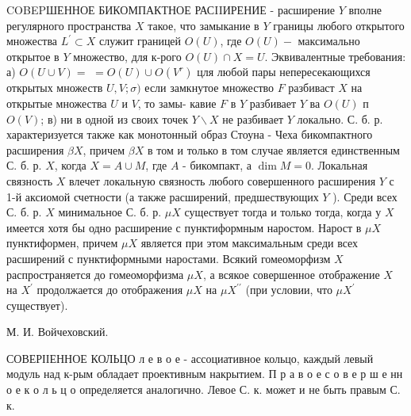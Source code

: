\documentclass[10pt]{article}
\begin{document}
COBEPШЕННОЕ БИКОМПАКТНОЕ РАСIIИРЕНИЕ - расширение $Y$ вполне регулярного пространства $X$ такое, что замыкание в $Y$ границы любого открытого множества $L^{\prime} \subset X$ служит границей $O(U)$, где $O(U)-$ максимально открытое в $Y$ множество, для к-рого $O(U) \cap X=U$. Эквивалентные требования: а) $O(U \cup V)=$ $=O(U) \cup O\left(V^{r}\right)$ цля любой пары непересекающихся открытых множеств $U, V ; \sigma)$ если замкнутое множество $F$ разбиваст $X$ на открытые множества $U$ и $V$, то замы- кавие $F$ в $Y$ разбивает $Y$ ва $O(U)$ п $O(V)$; в) ни в одной из своих точек $Y \backslash X$ не разбивает $Y$ локально. С. б. р. характеризуется также как монотонный образ Стоуна - Чеха бикомпактного расширения $\beta X$, причем $\beta X$ в том и только в том случае является единственным С. б. р. $X$, когда $X=A \cup M$, где $A$ - бикомпакт, а $\operatorname{dim} M=0$. Локальная связность $X$ влечет локальную связность любого совершенного расширения $Y$ с 1-й аксиомой счетности (а также расширений, предшествующих $Y$ ). Среди всех С. б. р. $X$ минимальное С. б. р. $\mu X$ существует тогда и только тогда, когда у $X$ имеется хотя бы одно расширение с пунктиформным наростом. Нарост в $\mu X$ пунктиформен, причем $\mu X$ является при этом максимальным среди всех расширений с пунктиформными наростами. Всякий гомеоморфизм $X$ распространяется до гомеоморфизма $\mu X$, а всякое совершенное отображение $X$ на $X^{\prime}$ продолжается до отображения $\mu X$ на $\mu X^{\prime \prime}$ (при условии, что $\mu X^{\prime}$ существует).



М. И. Войчеховский.



СОВЕРІІЕННОЕ КОЛЬЦО л е в о е - ассоциативное кольцо, каждый левый модуль над к-рым обладает проективным накрытием. П р а в о е с о в е р ш е нн о е к о л ь ц о определяется аналогично. Левое С. к. может и не быть правым С. к.
\end{document}
